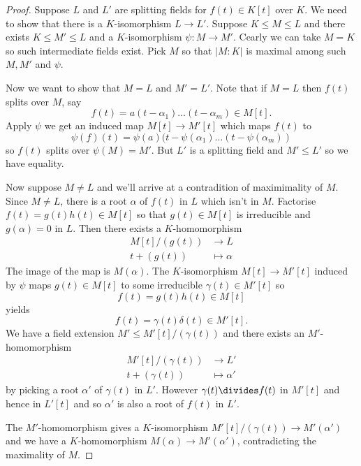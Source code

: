 \documentclass[a4paper]{article}
\begin{document}
\begin{proof}
  Suppose \(L\) and \(L'\) are splitting fields for \(f(t) \in K[t]\) over \(K\). We need to show that there is a \(K\)-isomorphism \(L \to L'\). Suppose \(K \leq M \leq L\) and there exists \(K \leq M' \leq L\) and a \(K\)-isomorphism \(\psi: M \to M'\). Cearly we can take \(M = K\) so such intermediate fields exist. Pick \(M\) so that \(|M : K|\) is maximal among such \(M, M'\) and \(\psi\).

  Now we want to show that \(M = L\) and \(M' = L'\). Note that if \(M = L\) then \(f(t)\) splits over \(M\), say
  \[
    f(t) = a(t - \alpha_1) \dots (t - \alpha_m) \in M[t].
  \]
  Apply \(\psi\) we get an induced map \(M[t] \to M'[t]\) which maps \(f(t)\) to
  \[
    \psi(f)(t) = \psi(a) (t - \psi(\alpha_1) \dots (t - \psi(\alpha_m))
  \]
  so \(f(t)\) splits over \(\psi(M) = M'\). But \(L'\) is a splitting field and \(M' \leq L'\) so we have equality.

  Now suppose \(M \neq L\) and we'll arrive at a contradition of maximimality of \(M\). Since \(M \neq L\), there is a root \(\alpha\) of \(f(t)\) in \(L\) which isn't in \(M\). Factorise \(f(t) = g(t)h(t) \in M[t]\) so that \(g(t) \in M[t]\) is irreducible and \(g(\alpha) = 0\) in \(L\). Then there exists a \(K\)-homomorphism
  \begin{align*}
    M[t]/(g(t)) &\to L \\
    t + (g(t)) &\mapsto \alpha
  \end{align*}
  The image of the map is \(M(\alpha)\). The \(K\)-isomorphism \(M[t] \to M'[t]\) induced by \(\psi\) maps \(g(t) \in M[t]\) to some irreducible \(\gamma(t) \in M'[t]\) so
  \[
    f(t) = g(t)h(t) \in M[t]
  \]
  yields
  \[
    f(t) = \gamma(t)\delta(t) \in M'[t].
  \]
  We have a field extension \(M' \leq M'[t]/(\gamma(t))\) and there exists an \(M'\)-homomorphism
  \begin{align*}
    M'[t]/(\gamma(t)) &\to L' \\
    t + (\gamma(t)) &\mapsto \alpha'
  \end{align*}
  by picking a root \(\alpha'\) of \(\gamma(t)\) in \(L'\). However \(\gamma(t) \divides f(t)\) in \(M'[t]\) and hence in \(L'[t]\) and so \(\alpha'\) is also a root of \(f(t)\) in \(L'\).

  The \(M'\)-homomorphism gives a \(K\)-isomorphism \(M'[t]/(\gamma(t)) \to M'(\alpha')\) and we have a \(K\)-homomorphism \(M(\alpha) \to M'(\alpha')\), contradicting the maximality of \(M\).
\end{proof}
\end{document}
